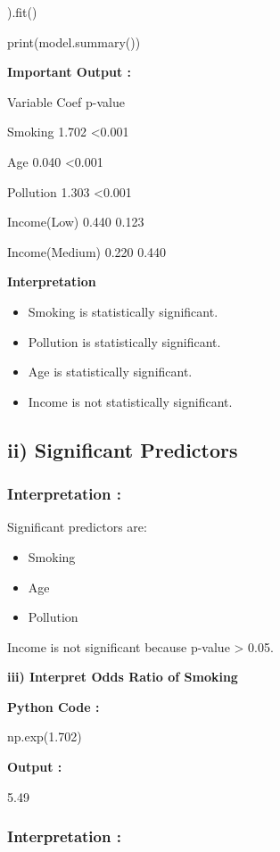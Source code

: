 \documentclass[
]{article}
\begin{document}
).fit()

print(model.summary())

\textbf{Important Output :}

Variable Coef p-value

Smoking 1.702 \textless0.001

Age 0.040 \textless0.001

Pollution 1.303 \textless0.001

Income(Low) 0.440 0.123

Income(Medium) 0.220 0.440

\textbf{Interpretation}

\begin{itemize}
\item
  Smoking is statistically significant.
\item
  Pollution is statistically significant.
\item
  Age is statistically significant.
\item
  Income is not statistically significant.
\end{itemize}

\subsection{\texorpdfstring{\textbf{ii) Significant
Predictors}}{ii) Significant Predictors}}\label{ii-significant-predictors}

\subsubsection{Interpretation :}\label{interpretation-2}

Significant predictors are:

\begin{itemize}
\item
  Smoking
\item
  Age
\item
  Pollution
\end{itemize}

Income is not significant because p-value \textgreater{} 0.05.

\textbf{iii) Interpret Odds Ratio of Smoking}

\textbf{Python Code :}

np.exp(1.702)

\textbf{Output :}

5.49

\subsubsection{Interpretation :}\label{interpretation-3}
\end{document}
